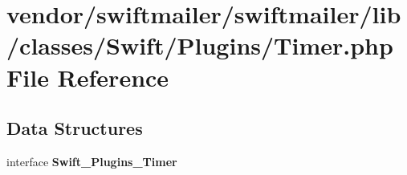 \section{vendor/swiftmailer/swiftmailer/lib/classes/\+Swift/\+Plugins/\+Timer.php File Reference}
\label{swiftmailer_2swiftmailer_2lib_2classes_2_swift_2_plugins_2_timer_8php}
\subsection*{Data Structures}
\begin{DoxyCompactItemize}
\item 
interface {\bf Swift\+\_\+\+Plugins\+\_\+\+Timer}
\end{DoxyCompactItemize}
